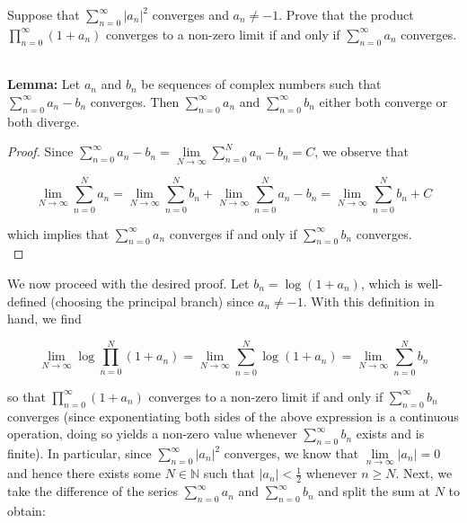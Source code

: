 Suppose that $\sum\limits_{n=0}^{\infty} |a_n|^2$ converges and $a_n \neq -1$. Prove that the product 
$\prod\limits_{n=0}^{\infty} (1 + a_n)$ converges to a non-zero limit if and only if $\sum\limits_{n=0}^{\infty} a_n$ 
converges.

\begin{solution}
  \ \\
  
  \textbf{Lemma: } Let $a_n$ and $b_n$ be sequences of complex numbers such that $\sum\limits_{n=0}^{\infty} a_n - b_n$ 
  converges. Then $\sum\limits_{n=0}^{\infty} a_n$ and $\sum\limits_{n=0}^{\infty} b_n$ either both converge or both 
  diverge.

  \begin{proof}
    Since $\sum\limits_{n=0}^{\infty} a_n - b_n = \lim\limits_{N \to \infty} \sum\limits_{n=0}^{N} a_n - b_n = C$, we 
    observe that

    $$
    \lim_{N \to \infty} \sum_{n=0}^{N} a_n = \lim_{N \to \infty} \sum_{n=0}^{N} b_n 
                                             + \lim_{N \to \infty} \sum_{n=0}^{N} a_n - b_n
                                           = \lim_{N \to \infty} \sum_{n=0}^{N} b_n + C
    $$

    which implies that $\sum\limits_{n=0}^{\infty} a_n$ converges if and only if $\sum\limits_{n=0}^{\infty} b_n$ 
    converges.
    \ \\
  \end{proof}

  We now proceed with the desired proof. Let $b_n = \log(1 + a_n)$, which is well-defined (choosing the principal 
  branch) since $a_n \neq -1$. With this definition in hand, we find

  $$
  \lim\limits_{N \to \infty} \log{\prod_{n=0}^{N} (1 + a_n)} 
    = \lim\limits_{N \to \infty}\sum_{n = 0}^{N} \log{(1 + a_n)} 
    = \lim\limits_{N \to \infty}\sum_{n = 0}^{N} b_n
  $$
  
  so that $\prod\limits_{n=0}^{\infty} \left(1 + a_n\right)$ converges to a non-zero limit if and only if 
  $\sum\limits_{n=0}^{\infty} b_n$ converges (since exponentiating both sides of the above expression is a continuous
  operation, doing so yields a non-zero value whenever $\sum\limits_{n=0}^{\infty} b_n$ exists and is finite). In 
  particular, since $\sum\limits_{n=0}^{\infty} |a_n|^2$ converges, we know that $\lim\limits_{n \to \infty} |a_n| = 0$ 
  and hence there exists some $N \in \mathbb{N}$ such that $|a_n| < \frac{1}{2}$ whenever $n \ge N$. Next, we take the 
  difference of the series $\sum\limits_{n=0}^{\infty} a_n$ and $\sum\limits_{n=0}^{\infty} b_n$ and split the sum at 
  $N$ to obtain:


\end{solution}
